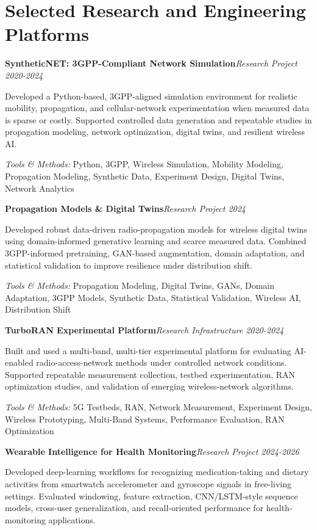 \documentclass[8pt,letterpaper]{extarticle}
\newcommand{\entry}[2]{\Needspace{4\baselineskip}\textbf{#1}\hfill\textit{#2}\par}
\begin{document}
\section{Selected Research and Engineering Platforms}
\entry{SyntheticNET: 3GPP-Compliant Network Simulation}{Research Project \textbar{} 2020-2024}
Developed a Python-based, 3GPP-aligned simulation environment for realistic mobility, propagation, and cellular-network experimentation when measured data is sparse or costly. Supported controlled data generation and repeatable studies in propagation modeling, network optimization, digital twins, and resilient wireless AI.\par
{\small\textit{Tools \& Methods:} Python, 3GPP, Wireless Simulation, Mobility Modeling, Propagation Modeling, Synthetic Data, Experiment Design, Digital Twins, Network Analytics\par}
\vspace{1pt}
\entry{Propagation Models \& Digital Twins}{Research Project \textbar{} 2024}
Developed robust data-driven radio-propagation models for wireless digital twins using domain-informed generative learning and scarce measured data. Combined 3GPP-informed pretraining, GAN-based augmentation, domain adaptation, and statistical validation to improve resilience under distribution shift.\par
{\small\textit{Tools \& Methods:} Propagation Modeling, Digital Twins, GANs, Domain Adaptation, 3GPP Models, Synthetic Data, Statistical Validation, Wireless AI, Distribution Shift\par}
\vspace{1pt}
\entry{TurboRAN Experimental Platform}{Research Infrastructure \textbar{} 2020-2024}
Built and used a multi-band, multi-tier experimental platform for evaluating AI-enabled radio-access-network methods under controlled network conditions. Supported repeatable measurement collection, testbed experimentation, RAN optimization studies, and validation of emerging wireless-network algorithms.\par
{\small\textit{Tools \& Methods:} 5G Testbeds, RAN, Network Measurement, Experiment Design, Wireless Prototyping, Multi-Band Systems, Performance Evaluation, RAN Optimization\par}
\vspace{1pt}
\entry{Wearable Intelligence for Health Monitoring}{Research Project \textbar{} 2024-2026}
Developed deep-learning workflows for recognizing medication-taking and dietary activities from smartwatch accelerometer and gyroscope signals in free-living settings. Evaluated windowing, feature extraction, CNN/LSTM-style sequence models, cross-user generalization, and recall-oriented performance for health-monitoring applications.\par
\end{document}
